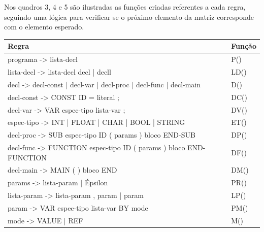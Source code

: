 \documentclass[12pt,oneside,a4paper,chapter=TITLE,section=TITLE,sumario=tradicional]{abntex2}
\begin{document}
Nos quadros 3, 4 e 5 são ilustradas as funções criadas referentes a cada regra, seguindo uma lógica para verificar se o próximo elemento da matriz corresponde com o elemento esperado. 

\begin{quadro}[htb]
    \centering
    \vspace{0.5cm}
    \begin{tabular}[h]{|p{13.0cm}|p{2.0cm}|}
        \hline
        \textbf{Regra} & \textbf{Função} \\ 
        \hline\hline
	programa -> lista-decl  & P()   \\ \hline 
	lista-decl -> lista-decl decl | decll  & LD()   \\ \hline 
	decl -> decl-const | decl-var | decl-proc | decl-func | decl-main  & D() \\ \hline
	decl-const -> CONST ID = literal ;  & DC()   \\ \hline 
	decl-var -> VAR espec-tipo lista-var ;  & DV()   \\ \hline 
	espec-tipo -> INT | FLOAT | CHAR | BOOL | STRING  & ET()   \\ \hline 
	decl-proc -> SUB espec-tipo ID ( params ) bloco END-SUB  & DP()   \\ \hline 
	decl-func -> FUNCTION espec-tipo ID ( params ) bloco END-FUNCTION  & DF()   \\ \hline 
	decl-main -> MAIN ( ) bloco END  & DM()   \\ \hline 
	params -> lista-param | Épsilon  & PR()   \\ \hline 
	lista-param -> lista-param , param | param  & LP()   \\ \hline 
	param -> VAR espec-tipo lista-var BY mode  & PM()   \\ \hline 
	mode -> VALUE | REF  & M()   \\ \hline 
    \end{tabular}
\end{quadro}
\end{document}
